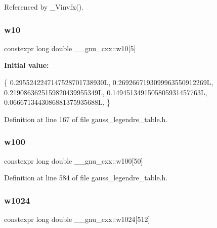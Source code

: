 Referenced by \+\_\+\+Vinvfx().

\mbox{\label{namespace____gnu__cxx_a3af4d95b4c212f870e055f3b9f3d8f71}} 
\subsubsection{\texorpdfstring{w10}{w10}}
{\footnotesize\ttfamily constexpr long double \+\_\+\+\_\+gnu\+\_\+cxx\+::w10\mbox{[}5\mbox{]}}

{\bfseries Initial value\+:}
\begin{DoxyCode}
\{
    0.2955242247147528701738930L,
    0.2692667193099963550912269L,
    0.2190863625159820439955349L,
    0.1494513491505805931457763L,
    0.0666713443086881375935688L,
  \}
\end{DoxyCode}


Definition at line 167 of file gauss\+\_\+legendre\+\_\+table.\+h.

\mbox{\label{namespace____gnu__cxx_a58bd389f530494f8e59ed83d812baf89}} 
\subsubsection{\texorpdfstring{w100}{w100}}
{\footnotesize\ttfamily constexpr long double \+\_\+\+\_\+gnu\+\_\+cxx\+::w100\mbox{[}50\mbox{]}}



Definition at line 584 of file gauss\+\_\+legendre\+\_\+table.\+h.

\mbox{\label{namespace____gnu__cxx_ac19ac482be7e2c7a347220d6ebb3172a}} 
\subsubsection{\texorpdfstring{w1024}{w1024}}
{\footnotesize\ttfamily constexpr long double \+\_\+\+\_\+gnu\+\_\+cxx\+::w1024\mbox{[}512\mbox{]}}



